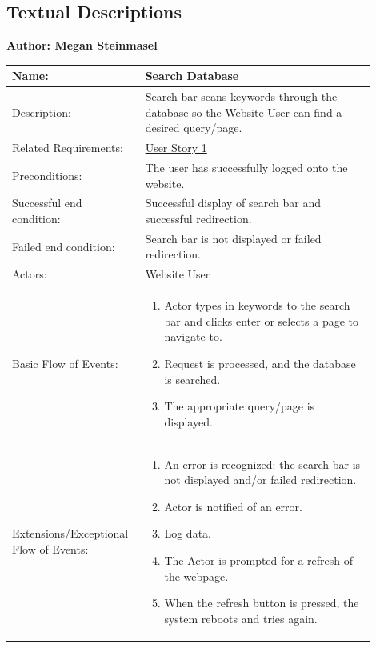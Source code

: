 \documentclass[11pt]{article}
\begin{document}
\subsection*{Textual Descriptions}

\begin{table}[!ht]
\begin{center}
\textbf{Author: Megan Steinmasel}
\vspace*{1em}

\begin{tabular}{p{0.30\linewidth}p{0.60\linewidth}}
	Name: & Search Database\\\hline
	Description: & Search bar scans keywords through the database so the Website User can find a desired query/page.\\\hline
	Related Requirements:& \hyperlink{us1}{User Story 1}\\\hline
	Preconditions:& The user has successfully logged onto the website.\\\hline
	Successful end condition:& Successful display of search bar and successful redirection.\\\hline
	Failed end condition:& Search bar is not displayed or failed redirection. \\\hline
	Actors:& Website User\\\hline
	Basic Flow of Events: & \begin{enumerate}
	\item Actor types in keywords to the search bar and clicks enter or selects a page to navigate to.
	\item Request is processed, and the database is searched.
	\item The appropriate query/page is displayed.
	\end{enumerate}\\\hline
	Extensions/Exceptional Flow of Events: & \begin{enumerate}
	\item An error is recognized: the search bar is not displayed and/or failed redirection.
	\item Actor is notified of an error.
	\item Log data.
	\item The Actor is prompted for a refresh of the webpage.
	\item When the refresh button is pressed, the system reboots and tries again.
	\end{enumerate}
\end{tabular}
\label{des:search_nav_menu}	
\end{center}
\end{table}
\end{document}
